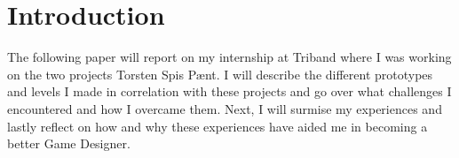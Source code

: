\section{Introduction}
The following paper will report on my internship at Triband where I was working on the two projects Torsten Spis P{\ae}nt. I will describe the different prototypes and levels I made in correlation with these projects and go over what challenges I encountered and how I overcame them. Next, I will surmise my experiences and lastly reflect on how and why these experiences have aided me in becoming a better Game Designer.
